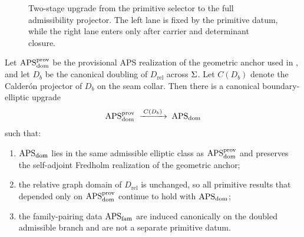 \begin{figure}[t]
\caption{Two-stage upgrade from the primitive selector to the full admissibility projector. The
left lane is fixed by the primitive datum, while the right lane enters only after carrier and
determinant closure.}
\label{fig:admissibility-stack}
\end{figure}

\begin{theorem}
\label{thm:apsdom-upgrade}
Let $\mathrm{APS}_{\mathrm{dom}}^{\mathrm{prov}}$ be the provisional APS realization of the geometric anchor used in
, and let $D_b$ be the canonical doubling of
$D_{\mathrm{rel}}$ across $\Sigma$. Let $C(D_b)$ denote the Calder\'on projector of $D_b$ on the
seam collar. Then there is a canonical boundary-elliptic upgrade
\[
\mathrm{APS}_{\mathrm{dom}}^{\mathrm{prov}}
\;\xrightarrow{\;C(D_b)\;}\;
\mathrm{APS}_{\mathrm{dom}}
\]
such that:
\begin{enumerate}[label=(\roman*), leftmargin=1.5em, topsep=3pt, itemsep=2pt]
    \item $\mathrm{APS}_{\mathrm{dom}}$ lies in the same admissible elliptic class as $\mathrm{APS}_{\mathrm{dom}}^{\mathrm{prov}}$ and preserves the
    self-adjoint Fredholm realization of the geometric anchor;
    \item the relative graph domain of $D_{\mathrm{rel}}$ is unchanged, so all primitive results
    that depended only on $\mathrm{APS}_{\mathrm{dom}}^{\mathrm{prov}}$ continue to hold with $\mathrm{APS}_{\mathrm{dom}}$;
    \item the family-pairing data $\mathrm{APS}_{\mathrm{fam}}$ are induced canonically on the doubled admissible
    branch and are not a separate primitive datum.
\end{enumerate}
\end{theorem}

